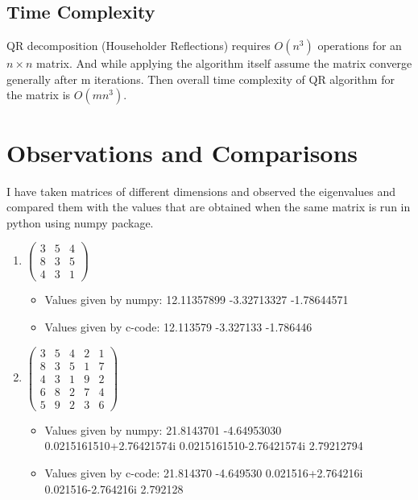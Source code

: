 \documentclass[a4paper, 14pt]{article}
\begin{document}
\subsection*{Time Complexity}
QR decomposition (Householder Reflections) requires $O(n^3)$ operations for an $n \times n $ matrix. And while applying the algorithm itself assume the matrix converge generally after m iterations. Then overall time complexity of QR algorithm for the matrix is $O(mn^3)$. 
\pagebreak
\section*{Observations and Comparisons}
I have taken matrices of different dimensions and observed the eigenvalues and compared them with the values that are obtained when the same matrix is run in python using numpy package.
\begin{enumerate}
\item $
\begin{pmatrix}
3 & 5 & 4 \\
8 & 3 & 5 \\
4 & 3 & 1
\end{pmatrix}
$
\begin{itemize}
	\item Values given by numpy: 12.11357899  -3.32713327 -1.78644571
	\item Values given by c-code: 12.113579  -3.327133  -1.786446
\end{itemize}

\item $\begin{pmatrix}
3 & 5 & 4 & 2 & 1 \\
8 & 3 & 5 & 1 & 7 \\
4 & 3 & 1 & 9 & 2 \\
6 & 8 & 2 & 7 & 4 \\
5 & 9 & 2 & 3 & 6
\end{pmatrix}$
\begin{itemize}
	\item Values given by numpy: 21.8143701  -4.64953030  0.0215161510+2.76421574i  0.0215161510-2.76421574i  2.79212794
	\item Values given by c-code: 21.814370  -4.649530  0.021516+2.764216i  0.021516-2.764216i  2.792128
\end{itemize}


\end{enumerate}
\end{document}
